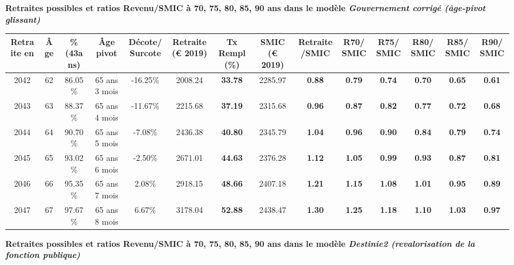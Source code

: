  \vspace{0.1cm} 
{\bf \noindent Retraites possibles et ratios Revenu/SMIC à 70, 75, 80, 85, 90 ans dans le modèle \emph{Gouvernement corrigé (âge-pivot glissant)}}  
 
\begin{adjustbox}{max width=\textwidth} 
\begin{tabular}[htb]{|c|c||c|c|c||c|c||c|c||c|c|c|c|c|} 
\hline 
 Retraite en &  Âge &  \%(43ans) &  Âge pivot &  Décote/Surcote &  Retraite (\euro{} 2019) &  Tx Rempl(\%) &  SMIC (\euro{} 2019) &  Retraite/SMIC &  R70/SMIC &  R75/SMIC &  R80/SMIC &  R85/SMIC &  R90/SMIC \\ 
\hline \hline 
 2042 &  62 &  86.05\% &  65 ans 3 mois &  -16.25\% &  2008.24 &  {\bf 33.78} &  2285.97 &  {\bf {\color{red} 0.88}} &  {\bf {\color{red} 0.79}} &  {\bf {\color{red} 0.74}} &  {\bf {\color{red} 0.70}} &  {\bf {\color{red} 0.65}} &  {\bf {\color{red} 0.61}} \\ 
\hline 
 2043 &  63 &  88.37\% &  65 ans 4 mois &  -11.67\% &  2215.68 &  {\bf 37.19} &  2315.68 &  {\bf {\color{red} 0.96}} &  {\bf {\color{red} 0.87}} &  {\bf {\color{red} 0.82}} &  {\bf {\color{red} 0.77}} &  {\bf {\color{red} 0.72}} &  {\bf {\color{red} 0.68}} \\ 
\hline 
 2044 &  64 &  90.70\% &  65 ans 5 mois &  -7.08\% &  2436.38 &  {\bf 40.80} &  2345.79 &  {\bf 1.04} &  {\bf {\color{red} 0.96}} &  {\bf {\color{red} 0.90}} &  {\bf {\color{red} 0.84}} &  {\bf {\color{red} 0.79}} &  {\bf {\color{red} 0.74}} \\ 
\hline 
 2045 &  65 &  93.02\% &  65 ans 6 mois &  -2.50\% &  2671.01 &  {\bf 44.63} &  2376.28 &  {\bf 1.12} &  {\bf 1.05} &  {\bf {\color{red} 0.99}} &  {\bf {\color{red} 0.93}} &  {\bf {\color{red} 0.87}} &  {\bf {\color{red} 0.81}} \\ 
\hline 
 2046 &  66 &  95.35\% &  65 ans 7 mois &  2.08\% &  2918.15 &  {\bf 48.66} &  2407.18 &  {\bf 1.21} &  {\bf 1.15} &  {\bf 1.08} &  {\bf 1.01} &  {\bf {\color{red} 0.95}} &  {\bf {\color{red} 0.89}} \\ 
\hline 
 2047 &  67 &  97.67\% &  65 ans 8 mois &  6.67\% &  3178.04 &  {\bf 52.88} &  2438.47 &  {\bf 1.30} &  {\bf 1.25} &  {\bf 1.18} &  {\bf 1.10} &  {\bf 1.03} &  {\bf {\color{red} 0.97}} \\ 
\hline 
\hline 
\end{tabular} 
\end{adjustbox} 
 
 \vspace{0.1cm} 
{\bf \noindent Retraites possibles et ratios Revenu/SMIC à 70, 75, 80, 85, 90 ans dans le modèle \emph{Destinie2 (revalorisation de la fonction publique)}}  
 

